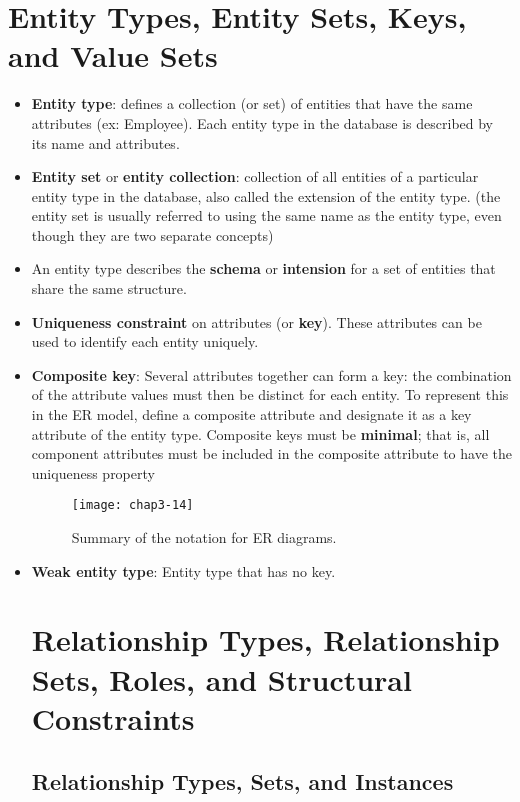 \section{Entity Types, Entity Sets, Keys, and Value Sets}
\begin{itemize}
    \item \textbf{Entity type}: defines a collection (or set) of entities that have the same attributes (ex: Employee). Each entity type in the database is described by its name and attributes.
    
    \item \textbf{Entity set} or \textbf{entity collection}: collection of all entities of a particular entity type in the database, also called the extension of the entity type. (the entity set is usually referred to using the same name as the entity type, even though they are two separate concepts)
    
    \item An entity type describes the \textbf{schema} or \textbf{intension} for a set of entities that share the same structure. 
    
    \item \textbf{Uniqueness constraint} on attributes (or \textbf{key}). These attributes can be used to identify each entity uniquely. 
    \item \textbf{Composite key}: Several attributes together can form a key: the combination of the attribute values must then be distinct for each entity. To represent this in the ER model, define a composite attribute and designate it as a key attribute of the entity type. Composite keys must be \textbf{minimal}; that is, all component attributes must be included in the composite attribute to have the uniqueness property

    \begin{figure}
        \centering
        \texttt{[image: chap3-14]}
        \caption{Summary of the notation for ER diagrams.}
        \label{fig:chap3-14}
    \end{figure}
    
    \item \textbf{Weak entity type}: Entity type that has no key.


\section{Relationship Types, Relationship Sets, Roles, and Structural Constraints}
    \subsection{Relationship Types, Sets, and Instances}

\end{itemize}

